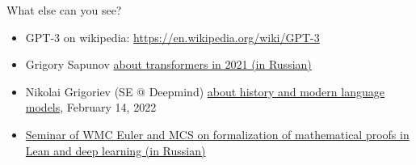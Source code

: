 \documentclass[fullscreen=true, bookmarks=true, hyperref={pdfencoding=unicode}]{beamer}
\begin{document}
\begin{frame}
What else can you see?
   \begin{itemize}
     \item GPT-3 on wikipedia: \href{https://en.wikipedia.org/wiki/GPT-3}{https://en.wikipedia.org/wiki/GPT-3}
     \item Grigory Sapunov \href{https://www.youtube.com/watch?v=8dN6ZVnDArk&t}{about transformers in 2021 (in Russian)}
     \item Nikolai Grigoriev (SE @ Deepmind) \href{https://www.youtube.com/watch?v=8Q-a6-P6Eyo}{about history and modern language models}, February 14, 2022
     \item \href{https://disk.yandex.ru/d/knoQ44wLmGDwwQ}{Seminar of WMC Euler and MCS on formalization of mathematical proofs in Lean and deep learning (in Russian)}
   \end{itemize}
\end{frame}
\end{document}
